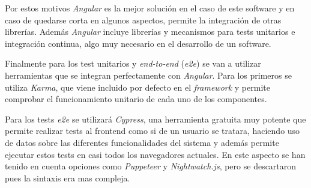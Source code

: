 Por estos motivos \textit{Angular} es la mejor solución en el caso de este software y en caso de quedarse corta en algunos aspectos, permite la integración de otras librerías. Además \textit{Angular} incluye librerías y mecanismos para tests unitarios e integración continua, algo muy necesario en el desarrollo de un software.

Finalmente para los test unitarios y \textit{end-to-end} (\textit{e2e}) se van a utilizar herramientas que se integran perfectamente con \textit{Angular}. Para los primeros se utiliza \textit{Karma}, que viene incluido por defecto en el \textit{framework} y permite comprobar el funcionamiento unitario de cada uno de los componentes.

Para los tests \textit{e2e} se utilizará \textit{Cypress}, una herramienta gratuita muy potente que permite realizar tests al frontend como si de un usuario se tratara, haciendo uso de datos sobre las diferentes funcionalidades del sistema y además permite ejecutar estos tests en casi todos los navegadores actuales. En este aspecto se han tenido en cuenta opciones como \textit{Puppeteer} y \textit{Nightwatch.js}, pero se descartaron pues la sintaxis era mas compleja.







